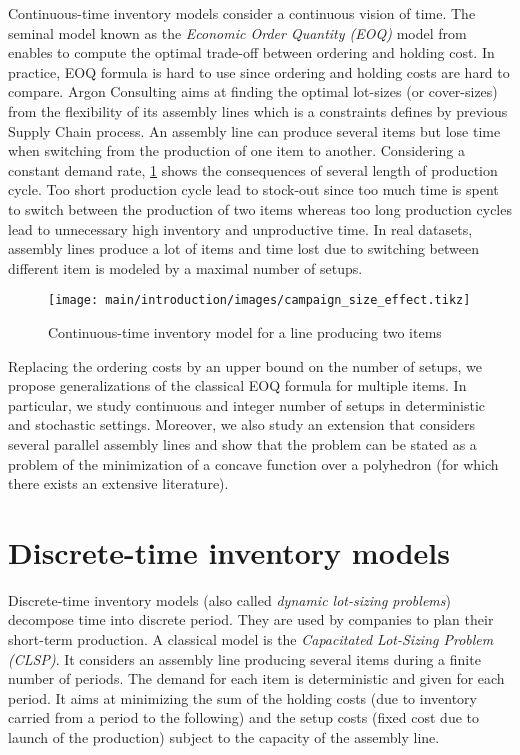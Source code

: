 Continuous-time inventory models consider a continuous vision of time.
The seminal model known as the \emph{Economic Order Quantity (EOQ)} model from \citet{Harris1913} enables to compute the optimal trade-off between ordering and holding cost.
In practice, EOQ formula is hard to use since ordering and holding costs are hard to compare.
Argon Consulting aims at finding the optimal lot-sizes (or cover-sizes) from the flexibility of its assembly lines which is a constraints defines by previous Supply Chain process.
An assembly line can produce several items but lose time when switching from the production of one item to another.
Considering a constant demand rate, \cref{fig:intro:en:continuous-time-inventory-model} shows the consequences of several length of production cycle.
Too short production cycle lead to stock-out since too much time is spent to switch between the production of two items whereas too long production cycles lead to unnecessary high inventory and unproductive time.
In real datasets, assembly lines produce a lot of items and time lost due to switching between different item is modeled by a maximal number of setups.


\begin{figure}[!ht]
  \centering
  \texttt{[image: main/introduction/images/campaign\_size\_effect.tikz]}
  \caption{Continuous-time inventory model for a line producing two items}
  \label{fig:intro:en:continuous-time-inventory-model}
\end{figure}


\medskip


Replacing the ordering costs by an upper bound on the number of setups, we propose generalizations of the classical EOQ formula for multiple items.
In particular, we study continuous and integer number of setups in deterministic and stochastic settings.
Moreover, we also study an extension that considers several parallel assembly lines and show that the problem can be stated as a problem of the minimization of a concave function over a polyhedron (for which there exists an extensive literature).




\section{Discrete-time inventory models}
\label{sec:intro:en:discrete-time-inventory-models}


Discrete-time inventory models (also called \emph{dynamic lot-sizing problems}) decompose time into discrete period.
They are used by companies to plan their short-term production.
A classical model is the \emph{Capacitated Lot-Sizing Problem (CLSP)}.
It considers an assembly line producing several items during a finite number of periods.
The demand for each item is deterministic and given for each period.
It aims at minimizing the sum of the holding costs (due to inventory carried from a period to the following) and the setup costs (fixed cost due to launch of the production) subject to the capacity of the assembly line.


